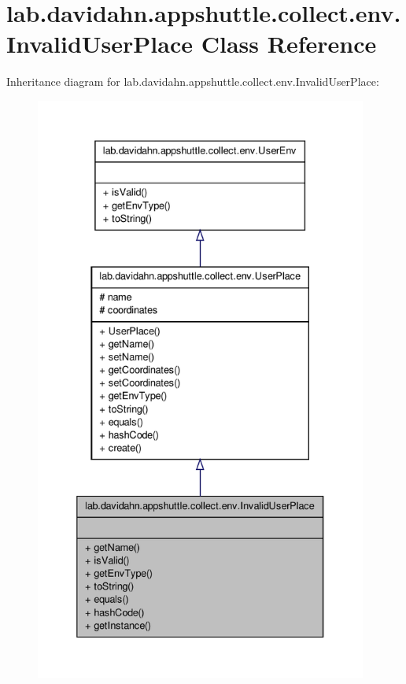 \hypertarget{classlab_1_1davidahn_1_1appshuttle_1_1collect_1_1env_1_1_invalid_user_place}{\section{lab.\-davidahn.\-appshuttle.\-collect.\-env.\-Invalid\-User\-Place \-Class \-Reference}
\label{classlab_1_1davidahn_1_1appshuttle_1_1collect_1_1env_1_1_invalid_user_place}
}


\-Inheritance diagram for lab.\-davidahn.\-appshuttle.\-collect.\-env.\-Invalid\-User\-Place\-:
\nopagebreak
\begin{figure}[H]
\begin{center}
\leavevmode
\includegraphics[height=550pt]{classlab_1_1davidahn_1_1appshuttle_1_1collect_1_1env_1_1_invalid_user_place__inherit__graph}
\end{center}
\end{figure}


